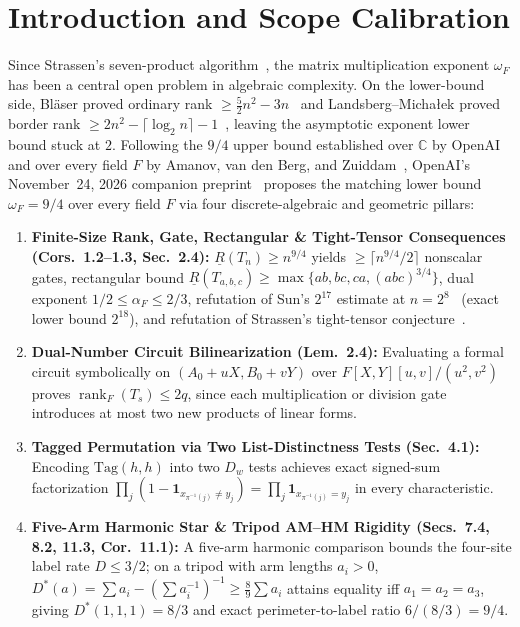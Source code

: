 \documentclass[10pt,twocolumn]{article}
\begin{document}
\section{Introduction and Scope Calibration}\label{sec:intro}
Since Strassen's seven-product algorithm~\cite{strassen1969gaussian}, the matrix multiplication exponent $\omega_F$ has been a central open problem in algebraic complexity. On the lower-bound side, Bl\"aser proved ordinary rank $\ge \frac{5}{2}n^2-3n$~\cite{blaser2000lower} and Landsberg--Micha{\l}ek proved border rank $\ge 2n^2-\lceil\log_2 n\rceil-1$~\cite{landsberg2018lower}, leaving the asymptotic exponent lower bound stuck at $2$. Following the $9/4$ upper bound established over $\mathbb{C}$ by OpenAI~\cite{openai2026omegaupper} and over every field $F$ by Amanov, van den Berg, and Zuiddam~\cite{amanov2026omega}, OpenAI's November~24, 2026 companion preprint~\cite{openai2026omega94} proposes the matching lower bound $\omega_F = 9/4$ over every field $F$ via four discrete-algebraic and geometric pillars:
\begin{enumerate}[leftmargin=1.2em,itemsep=1pt,topsep=2pt]
  \item \textbf{Finite-Size Rank, Gate, Rectangular \& Tight-Tensor Consequences (Cors.~1.2--1.3, Sec.~2.4):} $\underline{R}(T_n)\ge n^{9/4}$ yields $\ge\lceil n^{9/4}/2\rceil$ nonscalar gates, rectangular bound $\underline{R}(T_{a,b,c})\ge\max\{ab,bc,ca,(abc)^{3/4}\}$, dual exponent $1/2\le\alpha_F\le 2/3$, refutation of Sun's $2^{17}$ estimate at $n=2^8$~\cite{sun2026tensor} (exact lower bound $2^{18}$), and refutation of Strassen's tight-tensor conjecture~\cite{strassen1994algebra}.
  \item \textbf{Dual-Number Circuit Bilinearization (Lem.~2.4):} Evaluating a formal circuit symbolically on $(A_0+uX, B_0+vY)$ over $F[X,Y][u,v]/(u^2,v^2)$ proves $\operatorname{rank}_F(T_s)\le 2q$, since each multiplication or division gate introduces at most two new products of linear forms.
  \item \textbf{Tagged Permutation via Two List-Distinctness Tests (Sec.~4.1):} Encoding $\mathrm{Tag}(h,h)$ into two $D_w$ tests achieves exact signed-sum factorization $\prod_j(1-\mathbf{1}_{x_{\pi^{-1}(j)}\ne y_j})=\prod_j\mathbf{1}_{x_{\pi^{-1}(j)}=y_j}$ in every characteristic.
  \item \textbf{Five-Arm Harmonic Star \& Tripod AM--HM Rigidity (Secs.~7.4, 8.2, 11.3, Cor.~11.1):} A five-arm harmonic comparison bounds the four-site label rate $D\le 3/2$; on a tripod with arm lengths $a_i>0$, $D^*(a)=\sum a_i - (\sum a_i^{-1})^{-1}\ge\frac{8}{9}\sum a_i$ attains equality iff $a_1=a_2=a_3$, giving $D^*(1,1,1)=8/3$ and exact perimeter-to-label ratio $6/(8/3)=9/4$.
\end{enumerate}
\end{document}
